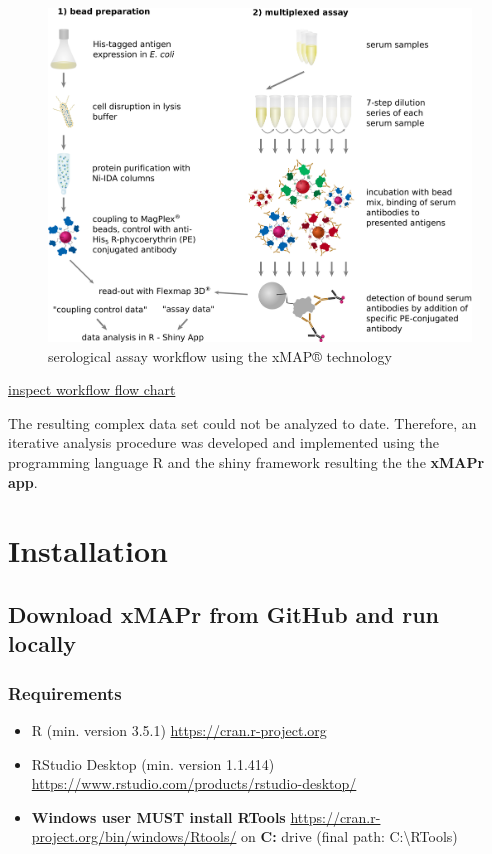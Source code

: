 \documentclass[
]{book}
\providecommand{\tightlist}{%
  \setlength{\itemsep}{0pt}\setlength{\parskip}{0pt}}
\begin{document}
\begin{figure}
\includegraphics[width=84.01in]{figures/serological_assay_workflow} \caption{serological assay workflow using the xMAP® technology}\label{fig:workflow}
\end{figure}

\href{figures/serological_assay_workflow.png}{inspect workflow flow chart}

The resulting complex data set could not be analyzed to date. Therefore, an iterative analysis procedure was developed and implemented using the programming language R and the shiny framework resulting the the \textbf{xMAPr app}.

\chapter{Installation}\label{installation}

\section{Download xMAPr from GitHub and run locally}\label{download-xmapr-from-github-and-run-locally}

\subsection{Requirements}\label{requirements}

\begin{itemize}
\tightlist
\item
  R (min. version 3.5.1) \url{https://cran.r-project.org}
\item
  RStudio Desktop (min. version 1.1.414) \url{https://www.rstudio.com/products/rstudio-desktop/}
\item
  \textbf{Windows user MUST install RTools} \url{https://cran.r-project.org/bin/windows/Rtools/} on \textbf{C:} drive (final path: C:\textbackslash RTools)
\end{itemize}
\end{document}
